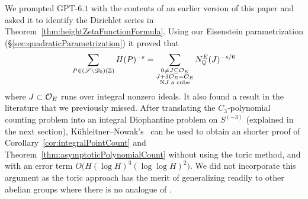 \begin{remarknode}

\label{rem:idealParametrization}


\leanok



 We prompted GPT-$6.1$ with the contents of an earlier version of this paper and asked it to identify the Dirichlet series in Theorem~\ref{thm:heightZetaFunctionFormula}. Using our Eisenstein parametrization (\S\ref{sec:quadraticParametrization}) it proved that \[ \sum_{P \in (\mathscr{S}\setminus\mathscr{D}_0)(\mathbb{Z})} H(P)^{-s} = \sum_{\substack{0\ne J\subseteq\mathcal{O}_E\\ J+3\mathcal{O}_E=\mathcal{O}_E\\ \mathrm N J\text{ a cube}}} N^E_{\mathbb{Q}}(J)^{-s/6} \] where $J \subset \mathcal{O}_E$ runs over integral nonzero ideals. It also found a result in the literature \cite{kuehleitnerNowak2004} that we previously missed. After translating the $C_3$-polynomial counting problem into an integral Diophantine problem on $S^{(-3)}$ (explained in the next section), K\"uhleitner--Nowak's~\cite[Corollary~2]{kuehleitnerNowak2004} can be used to obtain an shorter proof of Corollary~\ref{cor:integralPointCount} and Theorem~\ref{thm:asymptoticPolynomialCount} without using the toric method, and with an error term $O\bigl(H(\log H)^3(\log\log H)^2\bigr)$. We did not incorporate this argument as the toric approach has the merit of generalizing readily to other abelian groups where there is no analogue of \cite{kuehleitnerNowak2004}. 

\end{remarknode}

